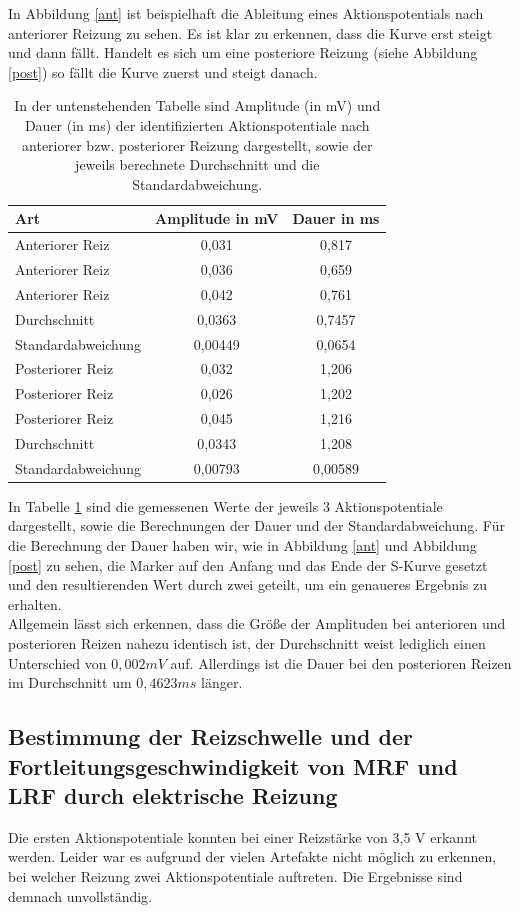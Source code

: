 \documentclass[11pt]{article}
\begin{document}
In Abbildung \ref{ant} ist beispielhaft die Ableitung eines Aktionspotentials nach anteriorer Reizung zu sehen. Es ist klar zu erkennen, dass die Kurve erst steigt und dann fällt. Handelt es sich um eine posteriore Reizung (siehe Abbildung \ref{post}) so fällt die Kurve zuerst und steigt danach.

\begin{table}[H]
\caption{In der untenstehenden Tabelle sind Amplitude (in mV) und Dauer (in ms) der identifizierten Aktionspotentiale nach anteriorer bzw. posteriorer Reizung dargestellt, sowie der jeweils berechnete Durchschnitt und die Standardabweichung.}
\begin{center}
\begin{tabular}{l||c|c}
Art & Amplitude in mV & Dauer in ms \\
\hline\hline
Anteriorer Reiz & 0,031 & 0,817\\
Anteriorer Reiz & 0,036 & 0,659\\
Anteriorer Reiz & 0,042 & 0,761\\
\hline
Durchschnitt & 0,0363& 0,7457\\
Standardabweichung & 0,00449 &0,0654 \\
\hline\hline
Posteriorer Reiz & 0,032 & 1,206\\
Posteriorer Reiz & 0,026& 1,202\\
Posteriorer Reiz & 0,045 & 1,216\\
\hline
Durchschnitt & 0,0343 & 1,208\\
Standardabweichung & 0,00793& 0,00589
\end{tabular}
\end{center}
\label{werte}
\end{table}

In Tabelle \ref{werte} sind die gemessenen Werte der jeweils 3 Aktionspotentiale dargestellt, sowie die Berechnungen der Dauer und der Standardabweichung. Für die Berechnung der Dauer haben wir, wie in Abbildung \ref{ant} und Abbildung \ref{post} zu sehen, die Marker auf den Anfang und das Ende der S-Kurve gesetzt und den resultierenden Wert durch zwei geteilt, um ein genaueres Ergebnis zu erhalten.\\
Allgemein lässt sich erkennen, dass die Größe der Amplituden bei anterioren und posterioren Reizen nahezu identisch ist, der Durchschnitt weist lediglich einen Unterschied von $0,002 mV$ auf. Allerdings ist die Dauer bei den posterioren Reizen im Durchschnitt um $0,4623 ms$ länger.


\subsection{Bestimmung der Reizschwelle und der Fortleitungsgeschwindigkeit von MRF und LRF durch elektrische Reizung}
Die ersten Aktionspotentiale konnten bei einer Reizstärke von 3,5 V erkannt werden. Leider war es aufgrund der vielen Artefakte nicht möglich zu erkennen, bei welcher Reizung zwei Aktionspotentiale auftreten. Die Ergebnisse sind demnach unvollständig. 
\end{document}
